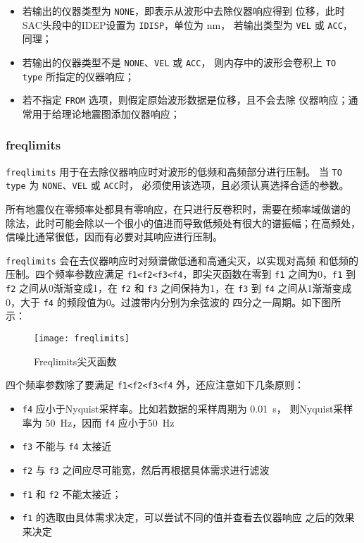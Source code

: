 \begin{itemize}
\item 若输出的仪器类型为 \texttt{NONE}，即表示从波形中去除仪器响应得到
    位移，此时SAC头段中的IDEP设置为 \texttt{IDISP}，单位为 \si{nm}，
    若输出类型为 \texttt{VEL} 或 \texttt{ACC}，同理；
\item 若输出的仪器类型不是 \texttt{NONE}、\texttt{VEL} 或 \texttt{ACC}，
    则内存中的波形会卷积上 \texttt{TO type} 所指定的仪器响应；
\item 若不指定 \texttt{FROM} 选项，则假定原始波形数据是位移，且不会去除
    仪器响应；通常用于给理论地震图添加仪器响应；
\end{itemize}

\subsubsection{freqlimits}
\texttt{freqlimits} 用于在去除仪器响应时对波形的低频和高频部分进行压制。
当 \texttt{TO type} 为 \texttt{NONE}、\texttt{VEL} 或 \texttt{ACC}时，
必须使用该选项，且必须认真选择合适的参数。

所有地震仪在零频率处都具有零响应，在只进行反卷积时，需要在频率域做谱的
除法，此时可能会除以一个很小的值进而导致低频处有很大的谱振幅；在高频处，
信噪比通常很低，因而有必要对其响应进行压制。

\texttt{freqlimits} 会在去仪器响应时对频谱做低通和高通尖灭，以实现对高频
和低频的压制。四个频率参数应满足 \texttt{f1<f2<f3<f4}，即尖灭函数在零到
\texttt{f1} 之间为0，\texttt{f1} 到 \texttt{f2} 之间从0渐渐变成1，在
\texttt{f2} 和 \texttt{f3} 之间保持为1，在 \texttt{f3} 到 \texttt{f4}
之间从1渐渐变成0，大于 \texttt{f4} 的频段值为0。过渡带内分别为余弦波的
四分之一周期。如下图所示：

\begin{figure}[H]
\centering
\texttt{[image: freqlimits]}
\caption{Freqlimits尖灭函数}
\label{fig:freqlimits}
\end{figure}

四个频率参数除了要满足 \texttt{f1<f2<f3<f4} 外，还应注意如下几条原则：
\begin{itemize}
\item \texttt{f4} 应小于Nyquist采样率。比如若数据的采样周期为 \SI{0.01}{\s}，
    则Nyquist采样率为 \SI{50}{\Hz}，因而 \texttt{f4} 应小于\SI{50}{\Hz}
\item \texttt{f3} 不能与 \texttt{f4} 太接近
\item \texttt{f2} 与 \texttt{f3} 之间应尽可能宽，然后再根据具体需求进行滤波
\item \texttt{f1} 和 \texttt{f2} 不能太接近；
\item \texttt{f1} 的选取由具体需求决定，可以尝试不同的值并查看去仪器响应
    之后的效果来决定
\end{itemize}

